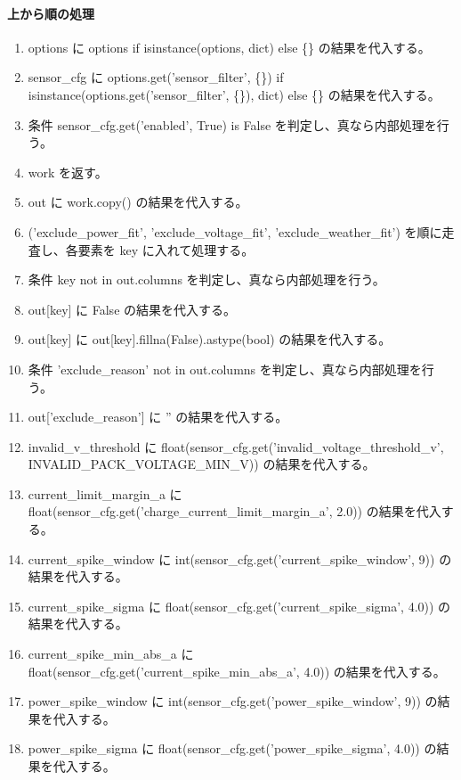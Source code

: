 \documentclass[a4paper,11pt]{article}
\begin{document}
            \paragraph{上から順の処理}
            \begin{enumerate}[leftmargin=1.8em]
            \item options に options if isinstance(options, dict) else \{\} の結果を代入する。
\item sensor\_cfg に options.get('sensor\_filter', \{\}) if isinstance(options.get('sensor\_filter', \{\}), dict) else \{\} の結果を代入する。
\item 条件 sensor\_cfg.get('enabled', True) is False を判定し、真なら内部処理を行う。
\item   work を返す。
\item out に work.copy() の結果を代入する。
\item ('exclude\_power\_fit', 'exclude\_voltage\_fit', 'exclude\_weather\_fit') を順に走査し、各要素を key に入れて処理する。
\item   条件 key not in out.columns を判定し、真なら内部処理を行う。
\item     out[key] に False の結果を代入する。
\item   out[key] に out[key].fillna(False).astype(bool) の結果を代入する。
\item 条件 'exclude\_reason' not in out.columns を判定し、真なら内部処理を行う。
\item   out['exclude\_reason'] に '' の結果を代入する。
\item invalid\_v\_threshold に float(sensor\_cfg.get('invalid\_voltage\_threshold\_v', INVALID\_PACK\_VOLTAGE\_MIN\_V)) の結果を代入する。
\item current\_limit\_margin\_a に float(sensor\_cfg.get('charge\_current\_limit\_margin\_a', 2.0)) の結果を代入する。
\item current\_spike\_window に int(sensor\_cfg.get('current\_spike\_window', 9)) の結果を代入する。
\item current\_spike\_sigma に float(sensor\_cfg.get('current\_spike\_sigma', 4.0)) の結果を代入する。
\item current\_spike\_min\_abs\_a に float(sensor\_cfg.get('current\_spike\_min\_abs\_a', 4.0)) の結果を代入する。
\item power\_spike\_window に int(sensor\_cfg.get('power\_spike\_window', 9)) の結果を代入する。
\item power\_spike\_sigma に float(sensor\_cfg.get('power\_spike\_sigma', 4.0)) の結果を代入する。

\end{enumerate}
\end{document}

